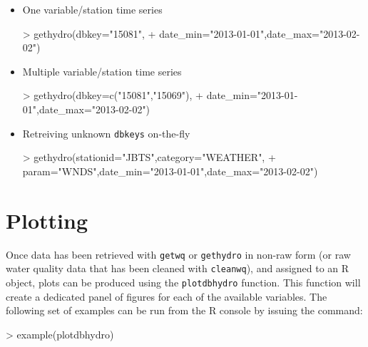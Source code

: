 \documentclass[12pt,notitlepage]{article}
\begin{document}
\begin{itemize}
\item One variable/station time series
\begin{Schunk}
\begin{Sinput}
> gethydro(dbkey="15081",
+          date_min="2013-01-01",date_max="2013-02-02")
\end{Sinput}
\end{Schunk}

\item Multiple variable/station time series
\begin{Schunk}
\begin{Sinput}
> gethydro(dbkey=c("15081","15069"),
+          date_min="2013-01-01",date_max="2013-02-02")
\end{Sinput}
\end{Schunk}

\item Retreiving unknown \texttt{dbkeys} on-the-fly

\begin{Schunk}
\begin{Sinput}
> gethydro(stationid="JBTS",category="WEATHER",
+          param="WNDS",date_min="2013-01-01",date_max="2013-02-02")
\end{Sinput}
\end{Schunk}

\end{itemize}

\section{Plotting}

Once data has been retrieved with \verb|getwq| or \texttt{gethydro} in non-raw form (or raw water quality data that has been cleaned with \verb|cleanwq|), and assigned to an R object, plots can be produced using the \verb|plotdbhydro| function. This function will create a dedicated panel of figures for each of the available variables. The following set of examples can be run from the R console by issuing the command:

\begin{Schunk}
\begin{Sinput}
> example(plotdbhydro)
\end{Sinput}
\end{Schunk}
\end{document}
